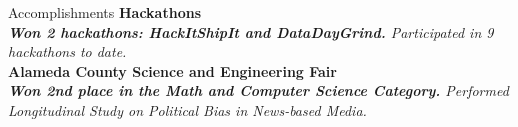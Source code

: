 \documentclass{resume} %
\begin{document}
\begin{rSection}{Accomplishments} 
\textbf{Hackathons}\\
\textit{\textbf{Won 2 hackathons: HackItShipIt and DataDayGrind.} Participated in 9 hackathons to date. } \\
\textbf{Alameda County Science and Engineering Fair}\\
\textit{\textbf{Won 2nd place in the Math and Computer Science Category.} Performed Longitudinal Study on Political Bias in News-based Media.}

\end{rSection}
\end{document}
